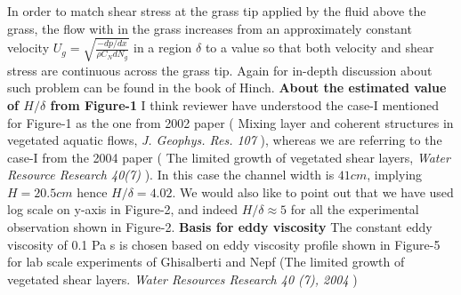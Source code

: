 \documentclass[letterpaper,10pt]{article}
\begin{document}
In order to match shear stress at the grass tip applied by the fluid above the grass, the flow with in the grass increases from an approximately constant velocity $U_g = \sqrt{\frac{-dp/dx}{\rho C_N d N_g}}$ in a region $\delta$ to a value so that both velocity and shear stress are continuous across the grass tip. Again for in-depth discussion about such problem can be found in the book of Hinch.   
\newline
\textbf{About the estimated value of $H/\delta$ from Figure-1}
\newline
I think reviewer have understood the case-I mentioned for Figure-1 as the one from 2002 paper ( Mixing layer and coherent structures in vegetated aquatic flows, \textit{J. Geophys. Res. 107} ), whereas we are referring to the case-I from the 2004 paper ( The limited growth of vegetated shear layers, \textit{Water Resource Research 40(7)} ). In this case the channel width is $41cm$, implying $H=20.5 cm$ hence $H/\delta=4.02$. We would also like to point out that we have used log scale on y-axis in Figure-2, and indeed $H/\delta \approx 5$ for all the experimental observation shown in Figure-2.
\newline
\textbf{Basis for eddy viscosity}
\newline
The constant eddy viscosity of 0.1 Pa s is chosen based on eddy viscosity profile shown in Figure-5 for lab scale experiments of Ghisalberti and Nepf (The limited growth of vegetated shear layers. \textit{Water Resources Research 40 (7), 2004} )
\end{document}
